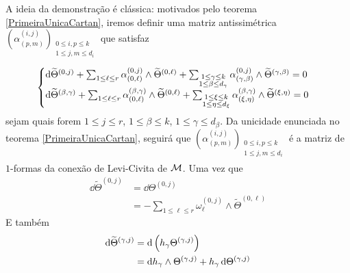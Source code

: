 \begin{demm}
A ideia da demonstração é clássica: motivados pelo teorema \cref{PrimeiraUnicaCartan}, iremos definir uma matriz antissimétrica $\left(\alpha^{(i, j)}_{(p, m)} \right)_{\substack{0 \leq i, p \leq k\\
1 \leq j, m \leq d_{i} \\
}} $
que satisfaz 
\begin{equation}\label{AlphaUnica}
\begin{cases}
\mathrm{d} \widetilde{\Theta}^{(0, j)} + \sum_{1 \leq \ell \leq r} \alpha^{(0, j)}_{(0, \ell)} \wedge \widetilde{\Theta}^{(0, \ell)} + \sum_{\substack{1\leq \gamma  \leq k\\
1 \leq \beta \leq d_{\gamma}\\
}} \alpha^{(0, j)}_{(\gamma, \beta)} \wedge \widetilde{\Theta}^{(\gamma, \beta)}= 0 \\
\mathrm{d} \widetilde{\Theta}^{(\beta, \gamma)} + \sum_{1 \leq \ell \leq r} \alpha^{(\beta, \gamma)}_{(0, \ell)} \wedge \widetilde{\Theta}^{(0, \ell)} + \sum_{\substack{1\leq \xi  \leq k\\
1 \leq \eta \leq d_{\xi}\\
}} \alpha^{(\beta, \gamma)}_{(\xi, \eta)} \wedge \widetilde{\Theta}^{(\xi, \eta)}= 0
\end{cases}
\end{equation}
sejam quais forem $1 \leq j \leq r$, $1 \leq \beta \leq k$, $1 \leq \gamma \leq d_{\beta}$. Da unicidade enunciada no teorema \cref{PrimeiraUnicaCartan}, seguirá que  $\left(\alpha^{(i, j)}_{(p, m)} \right)_{\substack{0 \leq i, p \leq k\\
1 \leq j, m \leq d_{i} \\
}} $ é a matriz de $1$-formas da conexão de Levi-Civita de $\mathcal{M}$. Uma vez que
\begin{equation}\label{AlphaUnica1}\begin{aligned}
\dd \widetilde{\Theta}^{(0, j)} &= \dd \Theta^{(0,j)} \\
&= - \sum_{1 \leq \ell \leq r} \omega^{(0, j)}_{\ell} \wedge \widetilde{\Theta}^{(0, \ell)}
\end{aligned}
\end{equation}
E também
\begin{equation}\label{AlphaUnica2}
\begin{aligned}
\dd \tioC{\Theta}{(\gamma, j)} &= \dd \left(h_{\gamma} \Theta^{(\gamma, j)} \right) \\
&= \dd h_{\gamma} \wedge \Theta^{(\gamma,j)} + h_{\gamma} \, \dd \Theta^{(\gamma, j)} \\

\end{aligned}
\end{equation}
\end{demm}
